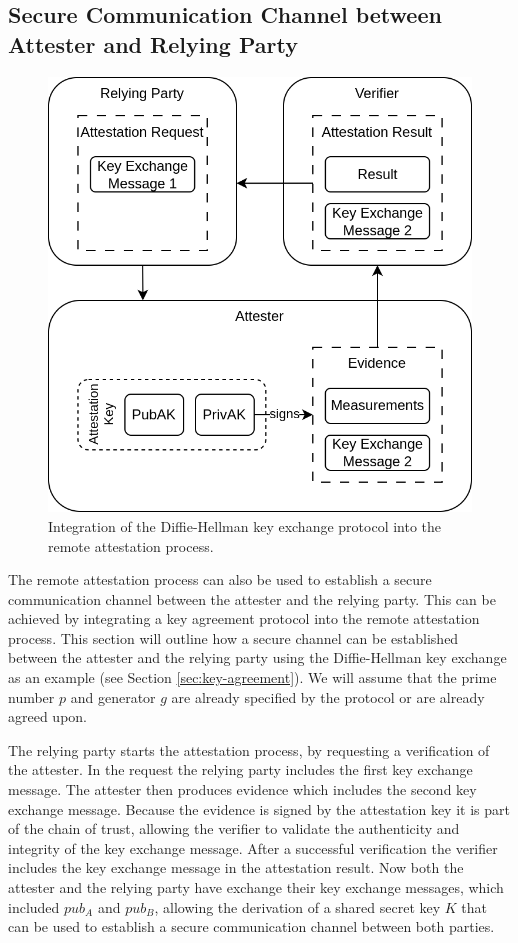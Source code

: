 \subsection{Secure Communication Channel between Attester and Relying Party}
\label{sec:ra-secure-communication-channel}

\begin{figure}[H]
  \centering
  \includegraphics[width=0.5\linewidth]{resources/ra-key-exchange.drawio.png}
  \caption{Integration of the Diffie-Hellman key exchange protocol into the remote attestation process.}
  \label{fig:ra-key-exchange}
\end{figure}

The remote attestation process can also be used to establish a secure
communication channel between the attester and the relying party. This can be
achieved by integrating a key agreement protocol into the remote attestation
process. This section will outline how a secure channel can be established
between the attester and the relying party using the Diffie-Hellman key exchange
as an example (see Section \ref{sec:key-agreement}). We will assume that the
prime number $p$ and generator $g$ are already specified by the protocol or are
already agreed upon.

The relying party starts the attestation process, by requesting a verification
of the attester. In the request the relying party includes the first key
exchange message. The attester then produces evidence which includes the second
key exchange message. Because the evidence is signed by the attestation key it
is part of the chain of trust, allowing the verifier to validate the
authenticity and integrity of the key exchange message. After a successful
verification the verifier includes the key exchange message in the attestation
result. Now both the attester and the relying party have exchange their key
exchange messages, which included $pub_A$ and $pub_B$, allowing the derivation
of a shared secret key $K$ that can be used to establish a secure communication
channel between both parties.

